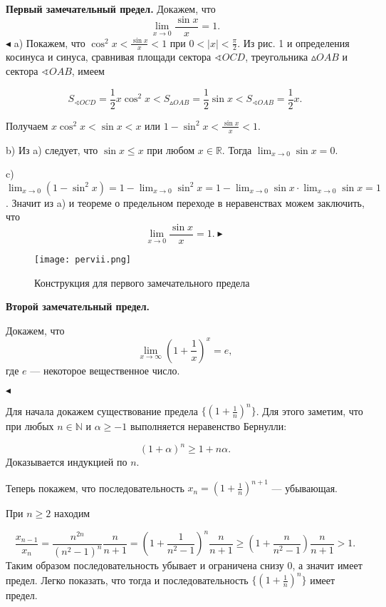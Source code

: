 \documentclass[12pt]{article}
\begin{document}
\textbf{Первый замечательный предел.} Докажем, что
$$
	\lim_{x\rightarrow 0} \frac{\sin x}{x} = 1.
$$
$\blacktriangleleft$ a) Покажем, что 
$\cos^2 x < \frac{\sin x}{x} < 1$ при $0 < |x| < \frac{\pi}{2}$. Из рис. 1 и определения косинуса и синуса, сравнивая площади сектора $\sphericalangle OCD$, треугольника $\vartriangle OAB$ и сектора $\sphericalangle OAB$, имеем

$$
	S_{\sphericalangle OCD} = \frac{1}{2} x\cos^2{x} < 
	S_{\vartriangle OAB} = \frac{1}{2} \sin{x} < S_{\sphericalangle OAB} = \frac{1}{2} x.
$$

Получаем $x \cos^2{x} < \sin{x} < x$ или $1 - \sin^2{x} < \frac{\sin{x}}{x} < 1$.

b) Из a) следует, что $\sin{x} \leq x$ при любом $x \in \mathbb{R}$. Тогда $\lim_{x\rightarrow 0}\sin{x} = 0$.

c) $\lim_{x\rightarrow 0} (1 - \sin^2{x}) = 1 -\lim_{x \rightarrow 0}\sin^2{x} = 1 - \lim_{x\rightarrow 0} \sin{x} \cdot\lim_{x\rightarrow 0} \sin{x} = 1$. Значит из a) и теореме о предельном переходе в неравенствах можем заключить, что
$$
	\lim_{x\rightarrow 0} \frac{\sin{x}}{x} = 1. \blacktriangleright
$$


\begin{figure}

\centering

\texttt{[image: pervii.png]}

\caption{Конструкция для первого замечательного предела}

\label{fig:mpr}

\end{figure}


\textbf{Второй замечательный предел.}

Докажем, что 
$$
\lim_{x\rightarrow \infty} \left( 1 +\frac{1}{x} \right)^x = e,
$$
где $e$ --- некоторое вещественное число.

$\blacktriangleleft$

Для начала докажем существование предела $\{ (1 + \frac{1}{n})^n\}$. Для этого заметим, что при любых $n \in \mathbb{N}$ и $\alpha \geq -1$ выполняется неравенство Бернулли:

$$
(1 + \alpha) ^ n \geq 1 + n\alpha. 
$$
Доказывается индукцией по $n$.

Теперь покажем, что последовательность $x_n = \left( 1 + \frac{1}{n} \right)^{n+1} $ --- убывающая. 

При $n \geq 2$ находим

$$
\frac{x_{n-1}}{x_{n}} = \frac{n^{2n}}{(n^2-1)^n} \frac{n}{n+1} = 
\left( 1 + \frac{1}{n^2 - 1}\right)^n \frac{n}{n+1} \geq \left( 1 + \frac{n}{n^2 - 1}\right) \frac{n}{n+1} > 1.
$$
Таким образом последовательность убывает и ограничена снизу 0, а значит имеет предел. Легко показать, что тогда и последовательность $ \{ \left( 1 + \frac{1}{n} \right)^{n} \}$ имеет предел.
\end{document}
